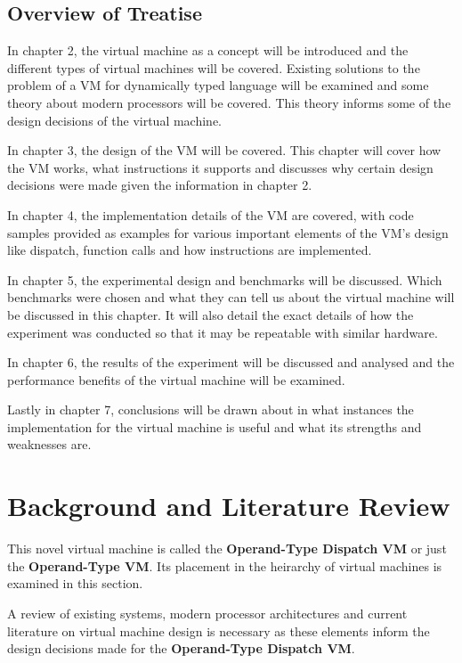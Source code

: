 \documentclass[english,a4paper]{report}
\begin{document}
\section{Overview of Treatise}
In chapter 2, the virtual machine as a concept will be introduced and
the different types of virtual machines will be covered. Existing
solutions to the problem of a VM for dynamically typed language will
be examined and some theory about modern processors will be
covered. This theory informs some of the design decisions of the
virtual machine.

In chapter 3, the design of the VM will be covered. This chapter will
cover how the VM works, what instructions it supports and discusses
why certain design decisions were made given the information in
chapter 2.

In chapter 4, the implementation details of the VM are covered, with
code samples provided as examples for various important elements of
the VM's design like dispatch, function calls and how instructions are
implemented.

In chapter 5, the experimental design and benchmarks will be
discussed. Which benchmarks were chosen and what they can tell us
about the virtual machine will be discussed in this chapter. It will
also detail the exact details of how the experiment was conducted so
that it may be repeatable with similar hardware.

In chapter 6, the results of the experiment will be discussed and
analysed and the performance benefits of the virtual machine will be
examined.

Lastly in chapter 7, conclusions will be drawn about in what instances
the implementation for the virtual machine is useful and what its
strengths and weaknesses are.
\newpage{}

\chapter{Background and Literature Review}
This novel virtual machine is called the \textbf{Operand-Type Dispatch
  VM} or just the \textbf{Operand-Type VM}. Its placement in the
heirarchy of virtual machines is examined in this section.

A review of existing systems, modern processor architectures and
current literature on virtual machine design is necessary as these
elements inform the design decisions made for the \textbf{Operand-Type
  Dispatch VM}.
\end{document}
